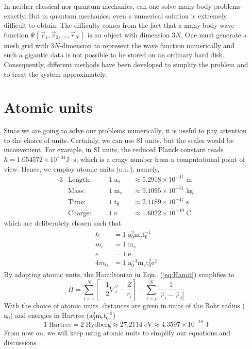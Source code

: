 In neither classical nor quantum mechanics, can one solve many-body problems
exactly. But in quantum mechanics, even a numerical solution is extremely
difficult to obtain. The difficulty comes from the fact that
a many-body wave function $\Psi(\vec{r}_1,\vec{r}_2,\ldots,\vec{r}_N)$ is
an object with dimension $3N$. One must generate a mesh grid with $3N$-dimension
to represent the wave function numerically and such a gigantic data is not
possible to be stored on an ordinary hard disk. Consequently, different methods
have been developed to simplify the problem and to treat the system approximately.

\section{Atomic units}
Since we are going to solve our problems numerically, it is
useful to pay attention to the choice of units. Certainly, we can use SI units,
but the scales would be inconvenient. For example, in SI units, the reduced
Planck constant reads $\hbar=1.054572\times10^{-34} \mathrm{J \cdot s}$, which
is a crazy number from a computational point of view. Hence, we employ atomic
units (a.u.), namely,
\begin{alignat*}{3}
& \text{Length:}\quad && 1\;\mathrm{a_0} && \approx 5.2918\times10^{-11}\;\mathrm{m}  \\
& \text{Mass:}\quad   && 1\;\mathrm{m_e} && \approx 9.1095\times10^{-31}\;\mathrm{kg} \\
& \text{Time:}\quad   && 1\;\mathrm{t_0} && \approx 2.4189\times10^{-17}\;\mathrm{s}  \\
& \text{Charge:}\quad && 1\;\mathrm{e}   && \approx 1.6022\times10^{-19}\;\mathrm{C}
\end{alignat*}
which are deliberately chosen such that
\begin{align}
\begin{split}
\hbar          & = 1\;\mathrm{a_0^2 m_e t_0^{-1}} \\
m_e            & = 1\;\mathrm{m_e} \\
e              & = 1\;\mathrm{e} \\
4\pi\epsilon_0 & = 1\;\mathrm{a_0^{-3} m_e t_0^2 e^2}
\end{split}
\end{align}
By adopting atomic units, the Hamiltonian in Eqn.~(\ref{eq:Hamit}) simplifies to
\begin{equation} \label{eq:HamitSimp}
H = \sum_{i=1}^N \left[ -\frac{1}{2} \nabla_i^2 - \frac{Z}{r_i} \right] + \sum_{i<j}^N \frac{1}{|\vec{r}_i - \vec{r}_j|}
\end{equation}
With the choice of atomic units, distances are given in units of the
Bohr radius ($\mathrm{a_0}$) and energies in Hartree ($\mathrm{a_0^2 m_e t_0^{-2}}$)
\begin{equation} \label{eq:EHartree}
  1\;\mathrm{Hartree}
= 2\;\mathrm{Rydberg}
\approx 27.2114\;\mathrm{eV}
\approx 4.3597\times10^{-18}\;\mathrm{J}
\end{equation}
From now on, we will keep using atomic units to simplify our equations and discussions.

